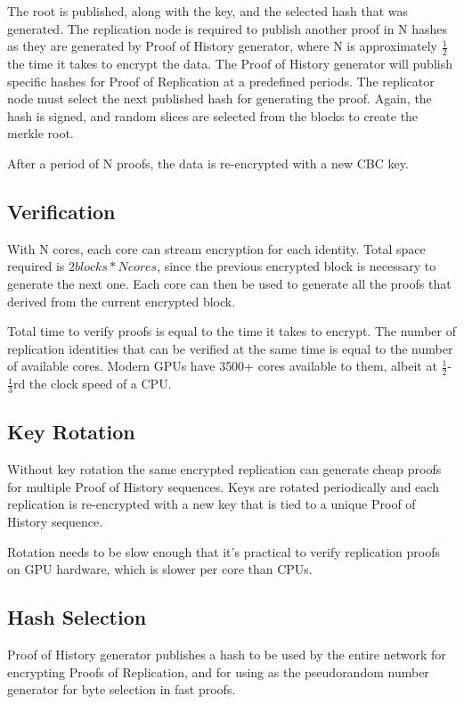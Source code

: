 \documentclass[12pt]{article}
\begin{document}
The root is published, along with the key, and the selected hash that was generated. The replication node is required to publish another proof in N hashes as they are generated by Proof of History generator, where N is approximately \(\frac{1}{2}\) the time it takes to encrypt the data. The Proof of History generator will publish specific hashes for Proof of Replication at a predefined periods. The replicator node must select the next published hash for generating the proof. Again, the hash is signed, and random slices are selected from the blocks to create the merkle root.

After a period of N proofs, the data is re-encrypted with a new CBC key.
\subsection{Verification}

With N cores, each core can stream encryption for each identity. Total space required is \(2 blocks * N cores\), since the previous encrypted block is necessary to generate the next one. Each core can then be used to generate all the proofs that derived from the current encrypted block.

Total time to verify proofs is equal to the time it takes to encrypt. The number of replication identities that can be verified at the same time is equal to the number of available cores. Modern GPUs have 3500+ cores available to them, albeit at \(\frac{1}{2}\)-\(\frac{1}{3}\)rd the clock speed of a CPU.

\subsection{Key Rotation}

Without key rotation the same encrypted replication can generate cheap proofs for multiple Proof of History sequences. Keys are rotated periodically and each replication is re-encrypted with a new key that is tied to a unique Proof of History sequence.

Rotation needs to be slow enough that it’s practical to verify replication proofs on GPU hardware, which is slower per core than CPUs.

\subsection{Hash Selection}\label{hashselection}

Proof of History generator publishes a hash to be used by the entire network for encrypting Proofs of Replication, and for using as the pseudorandom number generator for byte selection in fast proofs.
\end{document}
